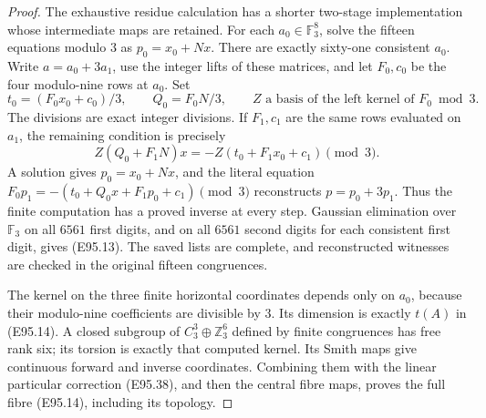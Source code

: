 \begin{proof}
The exhaustive residue calculation has a shorter
two-stage implementation whose intermediate maps
are retained. For each $a_0\in\mathbb F_3^8$, solve
the fifteen equations modulo $3$ as
$p_0=x_0+N x$. There are exactly sixty-one consistent
$a_0$. Write $a=a_0+3a_1$, use the integer lifts
of these matrices, and let $F_0,c_0$ be the four
modulo-nine rows at $a_0$. Set
\[
 t_0=(F_0x_0+c_0)/3,\qquad Q_0=F_0N/3,
 \qquad Z\text{ a basis of the left kernel of }F_0\bmod3.
 \tag{E95.40}
\]
The divisions are exact integer divisions. If
$F_1,c_1$ are the same rows evaluated on $a_1$,
the remaining condition is precisely
\[
 Z(Q_0+F_1N)x=-Z(t_0+F_1x_0+c_1)\pmod3.
 \tag{E95.41}
\]
A solution gives $p_0=x_0+Nx$, and the literal
equation
$F_0p_1=-(t_0+Q_0x+F_1p_0+c_1)\pmod3$
reconstructs $p=p_0+3p_1$. Thus the finite computation
has a proved inverse at every step. Gaussian
elimination over $\mathbb F_3$ on all $6561$ first
digits, and on all $6561$ second digits for each
consistent first digit, gives (E95.13). The saved
lists are complete, and reconstructed witnesses
are checked in the original fifteen congruences.

The kernel on the three finite horizontal coordinates
depends only on $a_0$, because their modulo-nine
coefficients are divisible by $3$. Its dimension
is exactly $t(A)$ in (E95.14). A closed subgroup
of $C_3^3\oplus\mathbb Z_3^6$ defined by finite
congruences has free rank six; its torsion is
exactly that computed kernel. Its Smith maps
give continuous forward and inverse coordinates.
Combining them with the linear particular correction
(E95.38), and then the central fibre maps, proves
the full fibre (E95.14), including its topology.


\end{proof}

